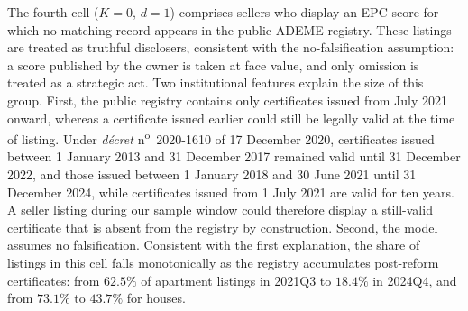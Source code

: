 The fourth cell ($K=0$, $d=1$) comprises sellers who display an EPC score for which no matching record appears in the public ADEME registry. These listings are treated as truthful disclosers, consistent with the no-falsification assumption: a score published by the owner is taken at face value, and only omission is treated as a strategic act. Two institutional features explain the size of this group. First, the public registry contains only certificates issued from July 2021 onward, whereas a certificate issued earlier could still be legally valid at the time of listing. Under \emph{d\'ecret} n\textsuperscript{o}~2020-1610 of 17 December 2020, certificates issued between 1 January 2013 and 31 December 2017 remained valid until 31 December 2022, and those issued between 1 January 2018 and 30 June 2021 until 31 December 2024, while certificates issued from 1 July 2021 are valid for ten years. A seller listing during our sample window could therefore display a still-valid certificate that is absent from the registry by construction. Second, the model assumes no falsification. Consistent with the first explanation, the share of listings in this cell falls monotonically as the registry accumulates post-reform certificates: from $62.5\%$ of apartment listings in 2021Q3 to $18.4\%$ in 2024Q4, and from $73.1\%$ to $43.7\%$ for houses.